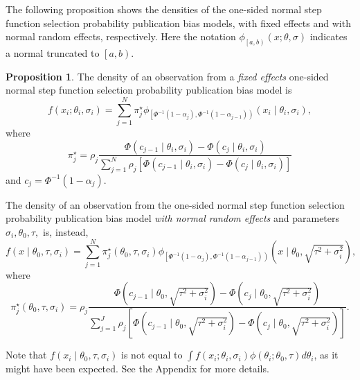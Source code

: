 \documentclass[preprint, authoryear]{elsarticle}
\theoremstyle{plain}
\theoremstyle{definition}
\newtheorem{prop}[theorem]{Proposition}
\begin{document}
The following proposition shows the densities of the one-sided normal step function selection probability publication bias models, with fixed effects and with normal random effects, respectively. Here the notation $\phi_{\left[a,b\right)}\left(x;\theta,\sigma\right)$ indicates a normal truncated to $\left[a,b\right)$.
\begin{prop}
\label{prop:One-sided normal discrete probability vector publication bias model-1}
The density of an observation from a \emph{fixed effects} one-sided normal step function selection probability publication bias model is
\begin{equation}\label{eq:Fixed effects, publication bias}
f\left(x_{i};\theta_{i},\sigma_{i}\right) = \sum_{j=1}^{N}\pi_{j}^\star\phi_{\left[\Phi^{-1}\left(1-\alpha_{j}\right),\Phi^{-1}\left(1-\alpha_{j-1}\right)\right)}\left(x_{i}\mid\theta_{i},\sigma_{i}\right),
\end{equation}
where
$$
\pi_{j}^{\star}=\rho_{j}\frac{\Phi\left(c_{j-1}\mid\theta_{i},\sigma_{i}\right)-\Phi\left(c_{j}\mid\theta_{i},\sigma_{i}\right)}{\sum_{j=1}^{N}\rho_{j}\left[\Phi\left(c_{j-1}\mid\theta_{i},\sigma_{i}\right)-\Phi\left(c_{j}\mid\theta_{i},\sigma_{i}\right)\right]}
$$
and $c_{j}=\Phi^{-1}\left(1-\alpha_{j}\right)$.

The density of an observation from the one-sided normal step function selection probability publication bias model \emph{with normal random effects} and parameters $\sigma_{i},\theta_{0},\tau,$ is, instead,
\begin{equation}\label{eq:Random effects, publication bias}
f\left(x\mid\theta_{0},\tau,\sigma_{i}\right)=\sum_{j=1}^{N}\pi_{j}^{\star}\left(\theta_0,\tau,\sigma_{i}\right)\phi_{\left[\Phi^{-1}\left(1-\alpha_{j}\right),\Phi^{-1}\left(1-\alpha_{j-1}\right)\right)}\left(x\mid\theta_{0},\sqrt{\tau^{2}+\sigma_{i}^{2}}\right),
\end{equation}
where 
\[
\pi_{j}^{\star}\left(\theta_0,\tau,\sigma_{i}\right)=\rho_{j}\frac{\Phi\left(c_{j-1}\mid\theta_{0},\sqrt{\tau^{2}+\sigma_{i}^{2}}\right)-\Phi\left(c_{j}\mid\theta_{0},\sqrt{\tau^{2}+\sigma_{i}^{2}}\right)}{\sum_{j=1}^{J}\rho_{j}\left[\Phi\left(c_{j-1}\mid\theta_{0},\sqrt{\tau^{2}+\sigma_{i}^{2}}\right)-\Phi\left(c_{j}\mid\theta_{0},\sqrt{\tau^{2}+\sigma_{i}^{2}}\right)\right]}.
\]
\end{prop}

Note that $f\left(x_i\mid\theta_{0},\tau,\sigma_i\right)$ is not equal to $\int f\left(x_{i};\theta_{i},\sigma_{i}\right)\phi\left(\theta_{i};\theta_{0},\tau\right)d\theta_{i}$,
as it might have been expected. See the Appendix for more details.
\end{document}
